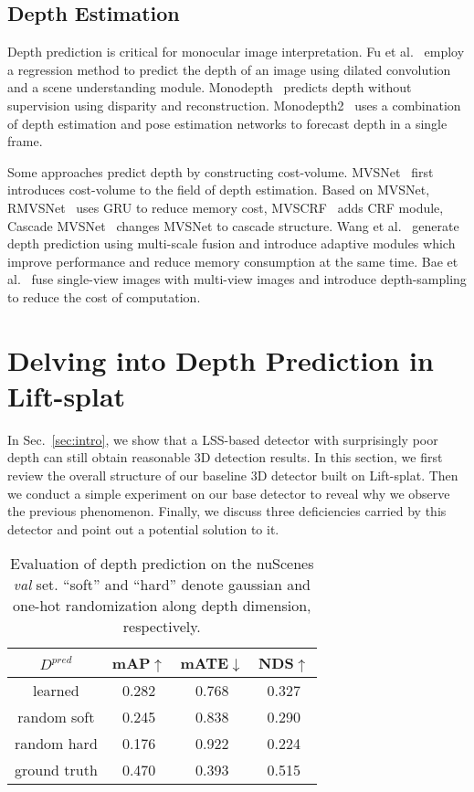 \documentclass[twocolumn,letterpaper]{article}
\begin{document}
\subsection{Depth Estimation}
Depth prediction is critical for monocular image interpretation. Fu et al.~\cite{fu2018deep} employ a regression method to predict the depth of an image using dilated convolution and a scene understanding module. Monodepth~\cite{godard2017unsupervised} predicts depth without supervision using disparity and reconstruction. Monodepth2~\cite{godard2019digging} uses a combination of depth estimation and pose estimation networks to forecast depth in a single frame.

Some approaches predict depth by constructing cost-volume. MVSNet~\cite{yao2018mvsnet} first introduces cost-volume to the field of depth estimation. Based on MVSNet, RMVSNet~\cite{yao2019recurrent} uses GRU to reduce memory cost, MVSCRF~\cite{xue2019mvscrf} adds CRF module, Cascade MVSNet~\cite{gu2020cascade} changes MVSNet to cascade structure. Wang et al.~\cite{wang2021patchmatchnet} generate depth prediction using multi-scale fusion and introduce adaptive modules which improve performance and reduce memory consumption at the same time. Bae et al.~\cite{bae2022multi} fuse single-view images with multi-view images and introduce depth-sampling to reduce the cost of computation.

\section{Delving into Depth Prediction in Lift-splat} \label{sec3}

In Sec.~\ref{sec:intro}, we show that a LSS-based detector with surprisingly poor depth can still obtain reasonable 3D detection results. In this section, we first review the overall structure of our baseline 3D detector built on Lift-splat. Then we conduct a simple experiment on our base detector to reveal why we observe the previous phenomenon. Finally, we discuss three deficiencies carried by this detector and point out a potential solution to it.

\begin{table}[!t]
\centering
\begin{tabular}{c|ccc} 
\toprule
\textbf{$D^{pred}$} &\textbf{mAP}$\uparrow$   & \textbf{mATE}$\downarrow$ & \textbf{NDS}$\uparrow$ \\
\midrule
 learned    & 0.282 & 0.768 & 0.327      \\
 random soft& 0.245 & 0.838 & 0.290   \\
 random hard& 0.176 &	0.922 & 0.224 \\ \midrule
 ground truth & 0.470 & 0.393 & 0.515 \\
 \bottomrule
\end{tabular}
\caption{Evaluation of depth prediction on the nuScenes \emph{val} set. ``soft'' and ``hard'' denote gaussian and one-hot randomization along depth dimension, respectively.}\label{tab:random}
\end{table}
\end{document}
